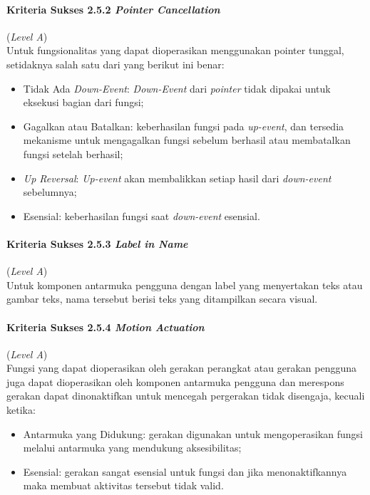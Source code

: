 \paragraph{Kriteria Sukses 2.5.2 \textit{Pointer Cancellation}}
\label{subsec:kriteria_2.5.2}
(\textit{Level A}) \\

Untuk fungsionalitas yang dapat dioperasikan menggunakan pointer tunggal, setidaknya salah satu dari yang berikut ini benar:

\begin{itemize}
	\item Tidak Ada \textit{Down-Event}: \textit{Down-Event} dari \textit{pointer} tidak dipakai untuk eksekusi bagian dari fungsi;
	\item Gagalkan atau Batalkan: keberhasilan fungsi pada \textit{up-event}, dan tersedia mekanisme untuk mengagalkan fungsi sebelum berhasil atau membatalkan fungsi setelah berhasil;
	\item \textit{Up Reversal}: \textit{Up-event} akan membalikkan setiap hasil dari \textit{down-event} sebelumnya;
	\item Esensial: keberhasilan fungsi saat \textit{down-event} esensial.
\end{itemize}

\paragraph{Kriteria Sukses 2.5.3 \textit{Label in Name}}
\label{subsec:kriteria_2.5.3}
(\textit{Level A}) \\

Untuk komponen antarmuka pengguna dengan label yang menyertakan teks atau gambar teks, nama tersebut berisi teks yang ditampilkan secara visual.

\paragraph{Kriteria Sukses 2.5.4 \textit{Motion Actuation}}
\label{subsec:kriteria_2.5.4}
(\textit{Level A}) \\

Fungsi yang dapat dioperasikan oleh gerakan perangkat atau gerakan pengguna juga dapat dioperasikan oleh komponen antarmuka pengguna dan merespons gerakan dapat dinonaktifkan untuk mencegah pergerakan tidak disengaja, kecuali ketika:

\begin{itemize}
	\item Antarmuka yang Didukung: gerakan digunakan untuk mengoperasikan fungsi melalui antarmuka yang mendukung aksesibilitas;
	\item Esensial: gerakan sangat esensial untuk fungsi dan jika menonaktifkannya maka membuat aktivitas tersebut tidak valid.
\end{itemize}

